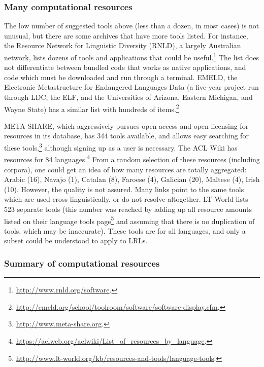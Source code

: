 \subsubsection{Many computational resources}

The low number of suggested tools above (less than a dozen, in most cases) is not unusual, but there are some archives that have more tools listed. For instance, the Resource Network for Linguistic Diversity (RNLD), a largely Australian network, lists dozens of tools and applications that could be useful.\footnote{\href{http://www.rnld.org/software}{http://www.rnld.org/software}. } The list does not differentiate between bundled code that works as native applications, and code which must be downloaded and run through a terminal. EMELD, the Electronic Metastructure for Endangered Languages Data (a five-year project run through LDC, the ELF, and the Universities of Arizona, Eastern Michigan, and Wayne State) has a similar list with hundreds of items.\footnote{\href{http://emeld.org/school/toolroom/software/software-display.cfm}{http://emeld.org/school/toolroom/software/software-display.cfm}. }

META-SHARE, which aggressively pursues open access and open licensing for resources in its database, has 344 tools available, and allows easy searching for these tools,\footnote{\href{http://www.meta-share.org/}{http://www.meta-share.org}. } although signing up as a user is necessary. The ACL Wiki has resources for 84 languages.\footnote{\href{https://aclweb.org/aclwiki/List_of_resources_by_language}{https://aclweb.org/aclwiki/List\_of\_resources\_by\_language}. } From a random selection of these resources (including corpora), one could get an idea of how many resources are totally aggregated: Arabic (16), Navajo (1), Catalan (8), Faroese (4), Galician (20), Maltese (4), Irish (10). However, the quality is not assured. Many links point to the same tools which are used cross-linguistically, or do not resolve altogether. LT-World lists 523 separate tools (this number was reached by adding up all resource amounts listed on their language tools page\footnote{\href{http://www.lt-world.org/kb/resources-and-tools/language-tools/}{http://www.lt-world.org/kb/resources-and-tools/language-tools}. } and assuming that there is no duplication of tools, which may be inaccurate). These tools are for all languages, and only a subset could be understood to apply to LRLs.

\subsubsection{Summary of computational resources}

